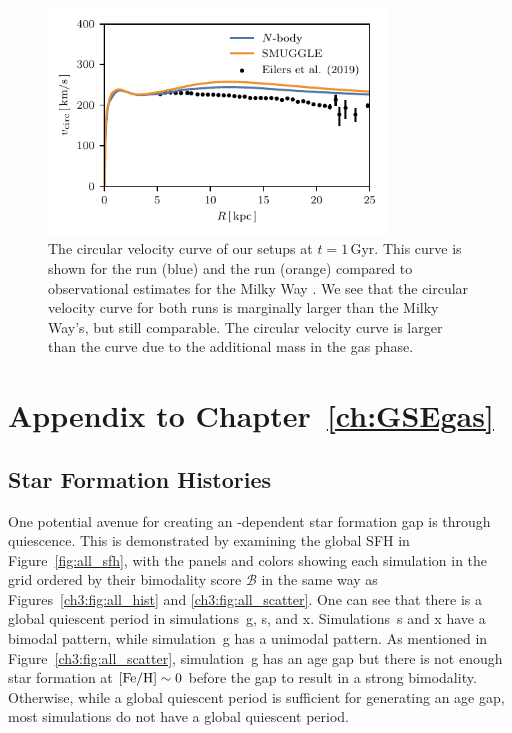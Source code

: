 \begin{appendices}
\begin{figure}
    \centering
    \includegraphics[width=9cm]{ch2/fig/vcirc.pdf}
    \caption{The circular velocity curve of our setups at $t=1\,\textrm{Gyr}$.
    This curve is shown for the \Nbody{} run (blue) and the \SMUGGLE{} run
    (orange) compared to observational estimates for the Milky Way
    \citep{2019ApJ...871..120E}. We see that the circular velocity curve for
    both runs is marginally larger than the Milky Way's, but still comparable.
    The \SMUGGLE{} circular velocity curve is larger than the \Nbody{} curve due
    to the additional mass in the gas phase.}
    \label{fig:vcirc}
\end{figure}

\chapter{Appendix to Chapter~\ref{ch:GSEgas}}\label{ch:app_GSEgas}

\section{Star Formation Histories}\label{ch3:app:all_sfh}
One potential avenue for creating an \FeH{}-dependent star formation gap is through quiescence. This is demonstrated by examining the global SFH in Figure~\ref{fig:all_sfh}, with the panels and colors showing each simulation in the grid ordered by their bimodality score $\mathcal{B}$ in the same way as Figures~\ref{ch3:fig:all_hist} and \ref{ch3:fig:all_scatter}. One can see that there is a global quiescent period in simulations~g, s, and x. Simulations~s and x have a bimodal pattern, while simulation~g has a unimodal pattern. As mentioned in Figure~\ref{ch3:fig:all_scatter}, simulation~g has an age gap but there is not enough star formation at $[\textrm{Fe}/\textrm{H}]\sim0$ before the gap to result in a strong bimodality. Otherwise, while a global quiescent period is sufficient for generating an age gap, most simulations do not have a global quiescent period.


\end{appendices}
